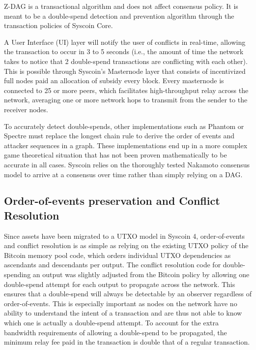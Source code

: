 \documentclass[peerreview]{ieeesyscoin}
\begin{document}
Z-DAG is a transactional algorithm and does not affect consensus policy. It is meant to be a double-spend detection and prevention algorithm through the transaction policies of Syscoin Core.

A User Interface (UI) layer will notify the user of conflicts in real-time, allowing the transaction to occur in 3 to 5 seconds (i.e., the amount of time the network takes to notice that 2 double-spend transactions are conflicting with each other). This is possible through Syscoin’s Masternode layer that consists of incentivized full nodes paid an allocation of subsidy every block. Every masternode is connected to 25 or more peers, which facilitates high-throughput relay across the network, averaging one or more network hops to transmit from the sender to the receiver nodes.

To accurately detect double-spends, other implementations such as Phantom \cite{Som18} or Spectre \cite{Som15} must replace the longest chain rule to derive the order of events and attacker sequences in a graph.
These implementations end up in a more complex game theoretical situation that has not  been proven mathematically to be accurate in all cases. Syscoin relies on the thoroughly tested Nakamoto consensus model to arrive at a consensus over time rather than simply relying on a DAG.

\subsection{Order-of-events preservation and Conflict Resolution}
Since assets have been migrated to a UTXO model in Syscoin 4, order-of-events and conflict resolution is as simple as relying on the existing UTXO policy of the Bitcoin memory pool code, which orders individual UTXO dependencies as ascendants and descendants per output. The conflict resolution code for double-spending an output was slightly adjusted from the Bitcoin policy by allowing one double-spend attempt for each output to propagate across the network. This ensures that a double-spend will always be detectable by an observer regardless of order-of-events. This is especially important as nodes on the network have no ability to understand the intent of a transaction and are thus not able to know which one is actually a double-spend attempt. To account for the extra bandwidth requirements of allowing a double-spend to be propagated, the minimum relay fee paid in the transaction is double that of a regular transaction. 
\end{document}
